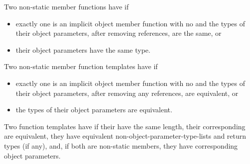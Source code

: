\pnum
Two non-static member functions have
 if
\begin{itemize}
\item
exactly one is an implicit object member function
with no  and
the types of their object parameters,
after removing references,
are the same, or
\item
their object parameters have the same type.
\end{itemize}
%
Two non-static member function templates have
 if
\begin{itemize}
\item
exactly one is an implicit object member function
with no  and
the types of their object parameters,
after removing any references,
are equivalent, or
\item
the types of their object parameters are equivalent.
\end{itemize}
%
Two function templates have
 if
their 
have the same length,
their corresponding  are equivalent,
they have equivalent non-object-parameter-type-lists and return types (if any), and,
if both are non-static members, they have corresponding object parameters.

